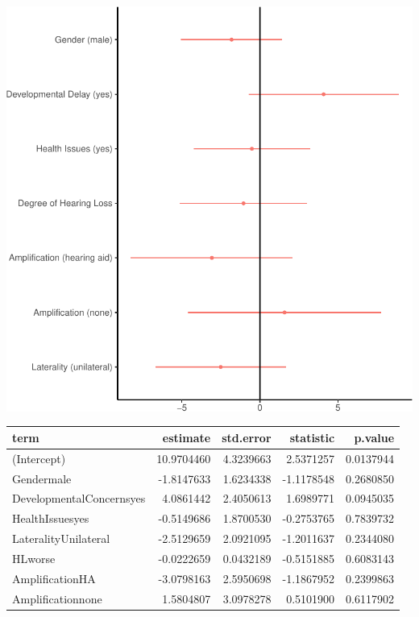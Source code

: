 \documentclass[english,man]{apa6}
\begin{document}
\includegraphics{ELSSP_paper_files/figure-latex/delay-betas-1.pdf}

\begin{table}[H]
\centering
\begin{tabular}{l|r|r|r|r}
\hline
term & estimate & std.error & statistic & p.value\\
\hline
(Intercept) & 10.9704460 & 4.3239663 & 2.5371257 & 0.0137944\\
\hline
Gendermale & -1.8147633 & 1.6234338 & -1.1178548 & 0.2680850\\
\hline
DevelopmentalConcernsyes & 4.0861442 & 2.4050613 & 1.6989771 & 0.0945035\\
\hline
HealthIssuesyes & -0.5149686 & 1.8700530 & -0.2753765 & 0.7839732\\
\hline
LateralityUnilateral & -2.5129659 & 2.0921095 & -1.2011637 & 0.2344080\\
\hline
HLworse & -0.0222659 & 0.0432189 & -0.5151885 & 0.6083143\\
\hline
AmplificationHA & -3.0798163 & 2.5950698 & -1.1867952 & 0.2399863\\
\hline
Amplificationnone & 1.5804807 & 3.0978278 & 0.5101900 & 0.6117902\\
\hline
\end{tabular}
\end{table}
\end{document}
